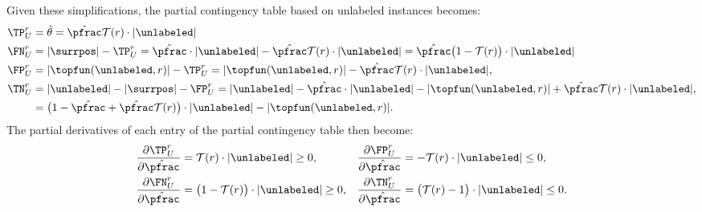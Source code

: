 Given these simplifications, the partial contingency table based on unlabeled instances becomes:
\begin{align*}
\TP_U^r &= \tilde{\theta} = \hat{\pfrac}\mathcal{T}(r) \cdot |\unlabeled| \\
\FN_U^r &= |\surrpos| - \TP_U^r = \hat{\pfrac}\cdot |\unlabeled| - \hat{\pfrac}\mathcal{T}(r) \cdot |\unlabeled| = \hat{\pfrac} \big(1-\mathcal{T}(r)\big) \cdot|\unlabeled| \nonumber \\
\FP_U^r &= |\topfun(\unlabeled, r)| - \TP_U^r = |\topfun(\unlabeled, r)| - \hat{\pfrac}\mathcal{T}(r) \cdot |\unlabeled|, \nonumber \\
\TN_U^r &= |\unlabeled| - |\surrpos| - \FP_U^r = |\unlabeled| - \hat{\pfrac}\cdot|\unlabeled| - |\topfun(\unlabeled, r)| + \hat{\pfrac}\mathcal{T}(r) \cdot |\unlabeled|, \\
	&= \big(1-\hat{\pfrac} + \hat{\pfrac}\mathcal{T}(r)\big) \cdot |\unlabeled| - |\topfun(\unlabeled, r)|.
\end{align*}
The partial derivatives of each entry of the partial contingency table then become:
\begin{align*}
\frac{\partial \TP_U^r}{\partial \hat{\pfrac}} &= \mathcal{T}(r) \cdot |\unlabeled| \geq 0, & &\frac{\partial \FP_U^r}{\partial \hat{\pfrac}} = -\mathcal{T}(r) \cdot |\unlabeled| \leq 0, \\
\frac{\partial \FN_U^r}{\partial \hat{\pfrac}} &= \big(1 -\mathcal{T}(r)\big) \cdot |\unlabeled| \geq 0, & &\frac{\partial \TN_U^r}{\partial \hat{\pfrac}} = \big(\mathcal{T}(r)-1\big) \cdot |\unlabeled| \leq 0.
\end{align*}

